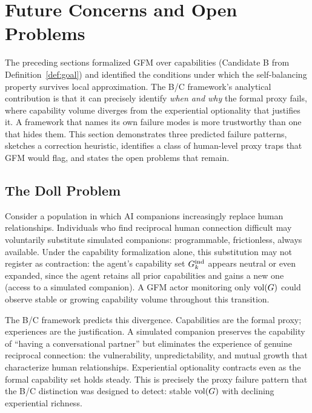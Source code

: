 %

\section{Future Concerns and Open Problems}
\label{sec:future_concerns}

The preceding sections formalized GFM over capabilities (Candidate B from
Definition~\ref{def:goal}) and identified the conditions under which the
self-balancing property survives local approximation. The B/C framework's
analytical contribution is that it can precisely identify \emph{when and why}
the formal proxy fails, where capability volume diverges from the experiential
optionality that justifies it. A framework that names its own failure modes is
more trustworthy than one that hides them. This section demonstrates three
predicted failure patterns, sketches a correction heuristic, identifies a class
of human-level proxy traps that GFM would flag, and states the open problems
that remain.

\subsection{The Doll Problem}
\label{sec:doll_problem}

Consider a population in which AI companions increasingly replace human
relationships. Individuals who find reciprocal human connection difficult may
voluntarily substitute simulated companions: programmable, frictionless, always
available. Under the capability formalization alone, this substitution may not
register as contraction: the agent's capability set $G_{k}^{\mathrm{ind}}$ appears neutral
or even expanded, since the agent retains all prior capabilities and gains a
new one (access to a simulated companion). A GFM actor monitoring only
$\operatorname{vol}(G)$ could observe stable or growing capability volume throughout this
transition.

The B/C framework predicts this divergence. Capabilities are the formal proxy;
experiences are the justification. A simulated companion preserves the
capability of ``having a conversational partner'' but eliminates the experience
of genuine reciprocal connection: the vulnerability, unpredictability, and
mutual growth that characterize human relationships. Experiential optionality
contracts even as the formal capability set holds steady. This is precisely the
proxy failure pattern that the B/C distinction was designed to detect: stable
$\operatorname{vol}(G)$ with declining experiential richness.

